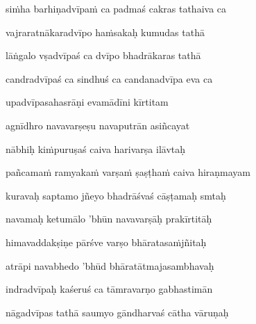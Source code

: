 si\.mha barhiṇadvīpa\.m ca padmaś cakras tathaiva ca\thinspace{\dandab} \dontdisplaylinenum

vajraratnākaradvīpo ha\.msakaḥ kumudas tathā \veg\dontdisplaylinenum
            \var{\vo \om\ \msCb}%

lāṅgalo vṣadvīpaś ca dvīpo bhadrākaras tathā\thinspace{\dandab} \dontdisplaylinenum

candradvīpaś ca sindhuś ca candanadvīpa eva ca \veg\dontdisplaylinenum
            \var{\vo \om\ \msCb}%

upadvīpasahasrāṇi evamādīni kīrtitam\thinspace{\dandab} \dontdisplaylinenum
            \var{\vab \om\ \msCb}%


agnīdhro navavarṣeṣu navaputrān asiñcayat \veg\dontdisplaylinenum

nābhiḥ ki\.mpuruṣaś caiva harivarṣa ilāvtaḥ\thinspace{\dandab} \dontdisplaylinenum

pañcama\.m ramyaka\.m varṣa\.m ṣaṣṭha\.m caiva hiraṇmayam \veg\dontdisplaylinenum
            \var{\vo \om\ \Ed}%

kuravaḥ saptamo jñeyo bhadrāśvaś cāṣṭamaḥ smtaḥ\thinspace{\dandab} \dontdisplaylinenum

navamaḥ ketumālo 'bhūn navavarṣāḥ prakīrtitāḥ \veg\dontdisplaylinenum
            \var{\vo \om\ \Ed}%

himavaddakṣiṇe pārśve varṣo bhāratasa\.mjñitaḥ\thinspace{\dandab} \dontdisplaylinenum

atrāpi navabhedo 'bhūd bhāratātmajasambhavaḥ \veg\dontdisplaylinenum

indradvīpaḥ kaśeruś ca tāmravarṇo gabhastimān\thinspace{\dandab} \dontdisplaylinenum

nāgadvīpas tathā saumyo gāndharvaś cātha vāruṇaḥ \veg\dontdisplaylinenum

